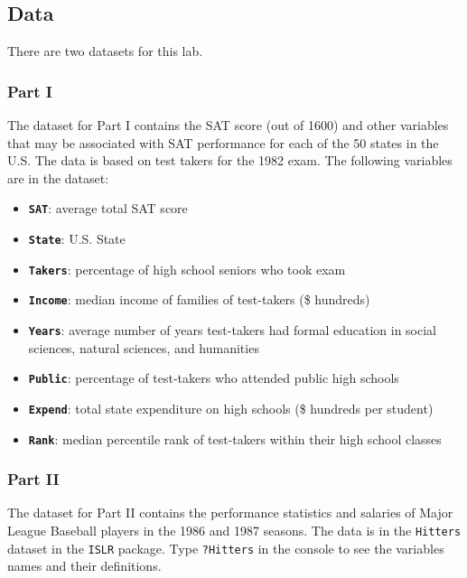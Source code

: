 \documentclass[]{book}
\providecommand{\tightlist}{%
  \setlength{\itemsep}{0pt}\setlength{\parskip}{0pt}}
\begin{document}
\subsection{Data}\label{data-5}

There are two datasets for this lab.

\subsubsection{Part I}\label{part-i}

The dataset for Part I contains the SAT score (out of 1600) and other
variables that may be associated with SAT performance for each of the 50
states in the U.S. The data is based on test takers for the 1982 exam.
The following variables are in the dataset:

\begin{itemize}
\tightlist
\item
  \textbf{\texttt{SAT}}: average total SAT score
\item
  \textbf{\texttt{State}}: U.S. State
\item
  \textbf{\texttt{Takers}}: percentage of high school seniors who took
  exam
\item
  \textbf{\texttt{Income}}: median income of families of test-takers (\$
  hundreds)
\item
  \textbf{\texttt{Years}}: average number of years test-takers had
  formal education in social sciences, natural sciences, and humanities
\item
  \textbf{\texttt{Public}}: percentage of test-takers who attended
  public high schools
\item
  \textbf{\texttt{Expend}}: total state expenditure on high schools (\$
  hundreds per student)
\item
  \textbf{\texttt{Rank}}: median percentile rank of test-takers within
  their high school classes
\end{itemize}

\subsubsection{Part II}\label{part-ii}

The dataset for Part II contains the performance statistics and salaries
of Major League Baseball players in the 1986 and 1987 seasons. The data
is in the \texttt{Hitters} dataset in the \texttt{ISLR} package. Type
\texttt{?Hitters} in the console to see the variables names and their
definitions.
\end{document}
